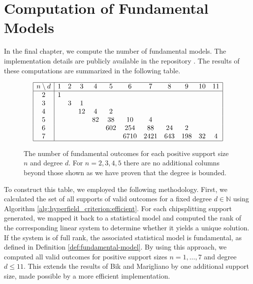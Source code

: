 \chapter{Computation of Fundamental Models}

In the final chapter, we compute the number of fundamental models. The implementation details are publicly available in the repository \cite{ducrepo}. The results of these computations are summarized in the following table.

\begin{figure}[H]
    \centering
    \[
    \begin{array}{|c|ccccccccccc|}
    \hline
    n \setminus d & 1 & 2 & 3 & 4 & 5 & 6 & 7 & 8 & 9 & 10 & 11 \\
    \hline
    2 & 1 &   &   &   &   &    &    &    &    &     &     \\
    3 &   & 3 & 1 &   &   &    &    &    &    &     &     \\
    4 &   &   & 12 & 4 & 2 &    &    &    &    &     &     \\
    5 &   &   &    & 82 & 38 & 10 & 4  &    &    &     &     \\
    6 &   &   &    &    & 602 & 254 & 88 & 24 & 2  &     &     \\
    7 &   &   &    &    &     & 6710 & 2421 & 643 & 198 & 32  & 4   \\
    \hline
    \end{array}
    \]
    \caption{The number of fundamental outcomes for each positive support size \( n \) and degree \( d \). For \( n = 2, 3, 4, 5 \) there are no additional columns beyond those shown as we have proven that the degree is bounded.}
    \label{table:computed-fundamental-models}
    \end{figure}


To construct this table, we employed the following methodology. First, we calculated the set of all supports of valid outcomes for a fixed degree \( d\in \mathbb{N} \) using Algorithm \ref{alg:hyperfield_criterion:efficient}. For each chipsplitting support generated, we mapped it back to a statistical model and computed the rank of the corresponding linear system to determine whether it yields a unique solution. If the system is of full rank, the associated statistical model is fundamental, as defined in Definition \ref{def:fundamental-model}. By using this approach, we computed all valid outcomes for positive support sizes \( n = 1, \dots, 7 \) and degree \( d \leq 11 \). This extends the results of Bik and Marigliano \cite{bik2022classifying} by one additional support size, made possible by a more efficient implementation.